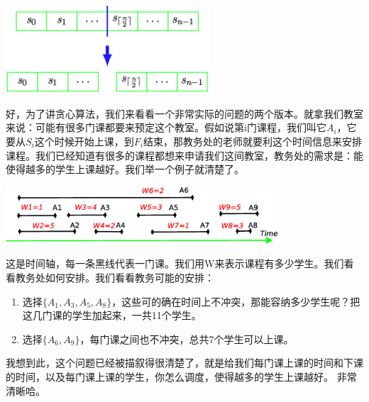 	\includegraphics[width=3in]{L5-incremental-dc2.png}
	
	好，为了讲贪心算法，我们来看看一个非常实际的问题的两个版本。就拿我们教室来说：可能有很多门课都要来预定这个教室。假如说第i门课程，我们叫它$A_i$，它要从$S_i$这个时候开始上课，到$F_i$结束，那教务处的老师就要利这个时间信息来安排课程。我们已经知道有很多的课程都想来申请我们这间教室，教务处的需求是：能使得越多的学生上课越好。我们举一个例子就清楚了。
	
	 \includegraphics[width=4in] {L7-intervalschedulingexample.eps}
	 
	这是时间轴，每一条黑线代表一门课。我们用W来表示课程有多少学生。我们看看教务处如何安排。我们看看教务可能的安排：
	\begin{enumerate}
		\item 
		选择$\{A_1,A_3,A_5,A_8\}$，这些可的确在时间上不冲突，那能容纳多少学生呢？把这几门课的学生加起来，一共11个学生。
		\item
		选择$\{A_6,A_9\}$，每门课之间也不冲突，总共7个学生可以上课。
	\end{enumerate}
	我想到此，这个问题已经被描叙得很清楚了，就是给我们每门课上课的时间和下课的时间，以及每门课上课的学生，你怎么调度，使得越多的学生上课越好。
	非常清晰哈。
	
